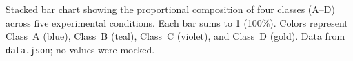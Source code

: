 \caption{Stacked bar chart showing the proportional composition of four classes (A--D) across five experimental conditions. Each bar sums to 1 (100\%). Colors represent Class~A (\textcolor[HTML]{0F4D92}{blue}), Class~B (\textcolor[HTML]{42949E}{teal}), Class~C (\textcolor[HTML]{9A4D8E}{violet}), and Class~D (\textcolor[HTML]{E28E2C}{gold}). Data from \texttt{data.json}; no values were mocked.}
